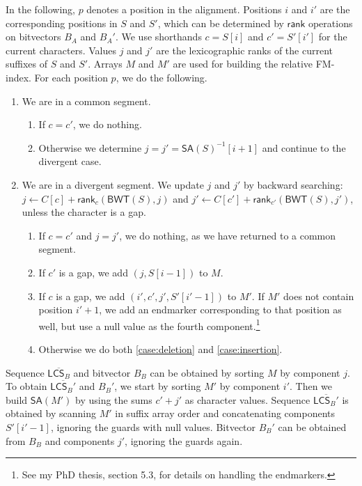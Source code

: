 \documentclass[11pt,a4paper]{article}
\newcommand{\BWT}
  {\ensuremath{\mathsf{BWT}}}
\newcommand{\SA}
  {\ensuremath{\mathsf{SA}}}
\newcommand{\LCS}
  {\ensuremath{\mathsf{LCS}}}
\newcommand{\mrank}{\ensuremath{\mathsf{rank}}}
\begin{document}
In the following, $p$ denotes a position in the alignment. Positions $i$ and $i'$ are the corresponding positions in $S$ and $S'$, which can be determined by $\mrank$ operations on bitvectors $B_{A}$ and $B_{A}'$. We use shorthands $c = S[i]$ and $c' = S'[i']$ for the current characters. Values $j$ and $j'$ are the lexicographic ranks of the current suffixes of $S$ and $S'$. Arrays $M$ and $M'$ are used for building the relative FM-index. For each position $p$, we do the following.

\begin{enumerate}

\item We are in a common segment.
\begin{enumerate}
\item If $c = c'$, we do nothing.
\item Otherwise we determine $j = j' = \SA(S)^{-1}[i + 1]$ and continue to the divergent case.
\end{enumerate}

\item We are in a divergent segment. We update $j$ and $j'$ by backward searching: $j \leftarrow C[c] + \mrank_{c}(\BWT(S), j)$ and $j' \leftarrow C[c'] + \mrank_{c'}(\BWT(S), j')$, unless the character is a gap.
\begin{enumerate}
\item If $c = c'$ and $j = j'$, we do nothing, as we have returned to a common segment.
\item If $c'$ is a gap, we add $(j, S[i-1])$ to $M$.\label{case:deletion}
\item If $c$ is a gap, we add $(i', c', j', S'[i'-1])$ to $M'$. If $M'$ does not contain position $i'+1$, we add an endmarker corresponding to that position as well, but use a null value as the fourth component.\footnote{See my PhD thesis, section 5.3, for details on handling the endmarkers.}\label{case:insertion}
\item Otherwise we do both \ref{case:deletion} and \ref{case:insertion}.
\end{enumerate}

\end{enumerate}

Sequence $\overline{\LCS_{B}}$ and bitvector $B_{B}$ can be obtained by sorting $M$ by component $j$. To obtain $\overline{\LCS_{B}'}$ and $B_{B}'$, we start by sorting $M'$ by component $i'$. Then we build $\SA(M')$ by using the sums $c'+j'$ as character values. Sequence $\overline{\LCS_{B}'}$ is obtained by scanning $M'$ in suffix array order and concatenating components $S'[i'-1]$, ignoring the guards with null values. Bitvector $B_{B}'$ can be obtained from $B_{B}$ and components $j'$, ignoring the guards again.
\end{document}
